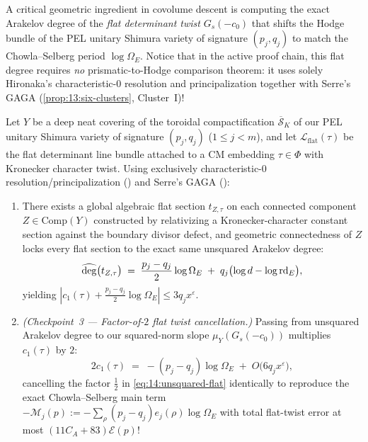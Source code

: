 A critical geometric ingredient in covolume descent is computing the exact Arakelov degree of the \emph{flat determinant twist} $G_s(-c_0)$ that shifts the Hodge bundle of the PEL unitary Shimura variety of signature $(p_j, q_j)$ to match the Chowla--Selberg period $\log\Omega_E$. Notice that in the active proof chain, this flat degree requires \emph{no} prismatic-to-Hodge comparison theorem: it uses solely Hironaka's characteristic-$0$ resolution and principalization together with Serre's GAGA (\cref{prop:13:six-clusters}, Cluster~I)!

\begin{proposition}
\label{prop:14:flat-deg}
Let $Y$ be a deep neat covering of the toroidal compactification $\overline{\mathcal{S}}_K$ of our PEL unitary Shimura variety of signature $(p_j, q_j)$ ($1 \le j < m$), and let $\mathcal{L}_{\mathrm{flat}}(\tau)$ be the flat determinant line bundle attached to a CM embedding $\tau \in \Phi$ with Kronecker character twist. Using exclusively characteristic-$0$ resolution/principalization (\cite{Hironaka1964}) and Serre's GAGA (\cite{Serre1956}):
\begin{enumerate}[label=\textup{(\roman*)}]
\item There exists a global algebraic flat section $t_{Z, \tau}$ on each connected component $Z \in \mathrm{Comp}(Y)$ constructed by relativizing a Kronecker-character constant section against the boundary divisor defect, and geometric connectedness of $Z$ locks every flat section to the exact same unsquared Arakelov degree:
  \begin{equation}
  \label{eq:14:unsquared-flat}
    \widehat{\deg}\bigl(t_{Z, \tau}\bigr) \;=\; \frac{p_j - q_j}{2}\log\Omega_E \;+\; q_j\bigl(\log d - \log\mathrm{rd}_E\bigr),
  \end{equation}
  yielding $|c_1(\tau) + \frac{p_j - q_j}{2}\log\Omega_E| \le 3 q_j x^\varepsilon$.
\item \emph{(Checkpoint~3 — Factor-of-$2$ flat twist cancellation.)} Passing from unsquared Arakelov degree to our squared-norm slope $\mu_Y(G_s(-c_0))$ multiplies $c_1(\tau)$ by $2$:
  \begin{equation}
  \label{eq:14:twice-twist}
    2 c_1(\tau) \;=\; -(p_j - q_j)\log\Omega_E \;+\; O\bigl(6 q_j x^\varepsilon\bigr),
  \end{equation}
  cancelling the factor $\frac{1}{2}$ in \eqref{eq:14:unsquared-flat} identically to reproduce the exact Chowla--Selberg main term $-\mathcal{M}_j(p) := -\sum_{\rho} (p_j - q_j) e_j(\rho)\log\Omega_E$ with total flat-twist error at most $(11 C_A + 83)\mathcal{E}(p)$!
\end{enumerate}
\end{proposition}

